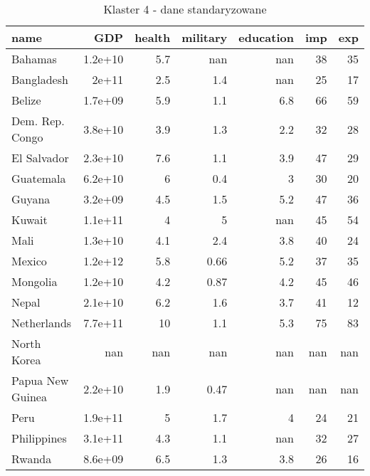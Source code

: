 \begin{table}
    \centering
    \caption{Klaster 4 - dane standaryzowane}
    \label{tab:cl4std}
    \begin{tabular}{lrrrrrr}
        \toprule
        name                & GDP     & health & military & education & imp & exp \\
        \midrule
        Bahamas             & 1.2e+10 & 5.7    & nan      & nan       & 38  & 35  \\
        Bangladesh          & 2e+11   & 2.5    & 1.4      & nan       & 25  & 17  \\
        Belize              & 1.7e+09 & 5.9    & 1.1      & 6.8       & 66  & 59  \\
        Dem. Rep. Congo     & 3.8e+10 & 3.9    & 1.3      & 2.2       & 32  & 28  \\
        El Salvador         & 2.3e+10 & 7.6    & 1.1      & 3.9       & 47  & 29  \\
        Guatemala           & 6.2e+10 & 6      & 0.4      & 3         & 30  & 20  \\
        Guyana              & 3.2e+09 & 4.5    & 1.5      & 5.2       & 47  & 36  \\
        Kuwait              & 1.1e+11 & 4      & 5        & nan       & 45  & 54  \\
        Mali                & 1.3e+10 & 4.1    & 2.4      & 3.8       & 40  & 24  \\
        Mexico              & 1.2e+12 & 5.8    & 0.66     & 5.2       & 37  & 35  \\
        Mongolia            & 1.2e+10 & 4.2    & 0.87     & 4.2       & 45  & 46  \\
        Nepal               & 2.1e+10 & 6.2    & 1.6      & 3.7       & 41  & 12  \\
        Netherlands         & 7.7e+11 & 10     & 1.1      & 5.3       & 75  & 83  \\
        North Korea         & nan     & nan    & nan      & nan       & nan & nan \\
        Papua New Guinea    & 2.2e+10 & 1.9    & 0.47     & nan       & nan & nan \\
        Peru                & 1.9e+11 & 5      & 1.7      & 4         & 24  & 21  \\
        Philippines         & 3.1e+11 & 4.3    & 1.1      & nan       & 32  & 27  \\
        Rwanda              & 8.6e+09 & 6.5    & 1.3      & 3.8       & 26  & 16  \\

\end{tabular}
\end{table}
